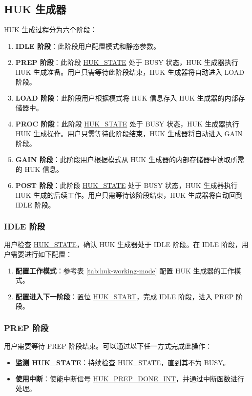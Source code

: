 \documentclass[main\_\_CN.tex]{subfiles}
\begin{document}
\subsection{HUK 生成器}
\label{sec:huk-generate}

HUK 生成过程分为六个阶段：
\begin{enumerate}
    \item \textbf{IDLE 阶段}：此阶段用户配置模式和静态参数。
    \item \textbf{PREP 阶段}：此阶段 \hyperref[fielddesc:HUKSTATE]{HUK\_STATE} 处于 BUSY 状态，HUK 生成器执行 HUK 生成准备。用户只需等待此阶段结束，HUK 生成器将自动进入 LOAD 阶段。
    \item \textbf{LOAD 阶段}：此阶段用户根据模式将 HUK 信息存入 HUK 生成器的内部存储器中。
    \item \textbf{PROC 阶段}：此阶段  \hyperref[fielddesc:HUKSTATE]{HUK\_STATE} 处于 BUSY 状态，HUK 生成器执行 HUK 生成操作。用户只需等待此阶段结束，HUK 生成器将自动进入 GAIN 阶段。
    \item \textbf{GAIN 阶段}：此阶段用户根据模式从 HUK 生成器的内部存储器中读取所需的 HUK 信息。
    \item \textbf{POST 阶段}：此阶段  \hyperref[fielddesc:HUKSTATE]{HUK\_STATE} 处于 BUSY 状态，HUK 生成器执行 HUK 生成的后续工作。用户只需等待该阶段结束，HUK 生成器将自动回到 IDLE 阶段。
\end{enumerate}

\subsubsection{IDLE 阶段}

用户检查 \hyperref[fielddesc:HUKSTATE]{HUK\_STATE}，确认 HUK 生成器处于 IDLE 阶段。在 IDLE 阶段，用户需要进行如下配置：
\begin{enumerate}
    \item \textbf{配置工作模式}：参考表 \ref{tab:huk-working-mode} 配置 HUK 生成器的工作模式。
    \item \textbf{配置进入下一阶段}：置位 \hyperref[fielddesc:HUKSTART]{HUK\_START}，完成 IDLE 阶段，进入 PREP 阶段。
\end{enumerate}

\subsubsection{PREP 阶段}

用户需要等待 PREP 阶段结束。可以通过以下任一方式完成此操作：
\begin{itemize}
    \item \textbf{监测 \hyperref[fielddesc:HUKSTATE]{HUK\_STATE}}：持续检查 \hyperref[fielddesc:HUKSTATE]{HUK\_STATE}，直到其不为 BUSY。
    \item \textbf{使用中断}：使能中断信号 \hyperref[int:HUKPREPDONEINT]{HUK\_PREP\_DONE\_INT}，并通过中断函数进行处理。
\end{itemize}
\end{document}
